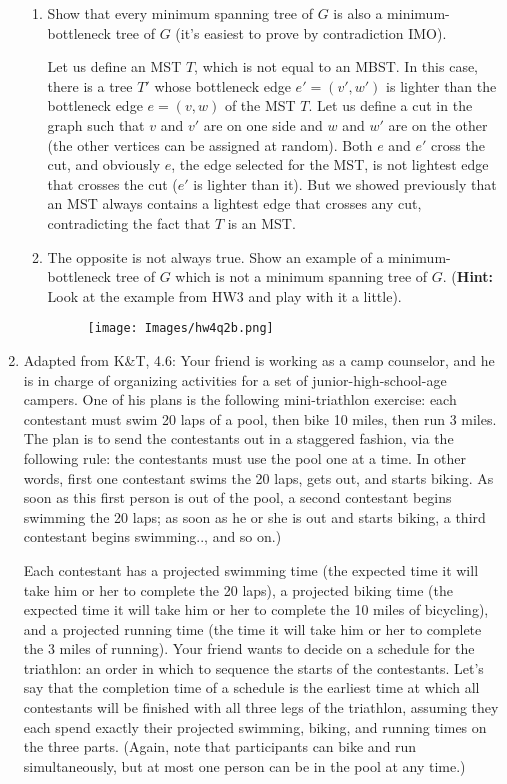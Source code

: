 \documentclass[letterpaper, 11pt]{article}
\begin{document}
\begin{enumerate}
    \begin{enumerate}
        \item Show that every minimum spanning tree of $G$ is also a minimum-bottleneck tree of $G$ (it's easiest to prove by contradiction IMO).

        Let us define an MST $T$, which is not equal to an MBST. In this case, there is a tree $T'$ whose bottleneck edge $e' = (v', w')$ is lighter than the bottleneck edge $e = (v,w)$ of the MST $T$. Let us define a cut in the graph such that $v$ and $v'$ are on one side and $w$ and $w'$ are on the other (the other vertices can be assigned at random). Both $e$ and $e'$ cross the cut, and obviously $e$, the edge selected for the MST, is not lightest edge that crosses the cut ($e'$ is lighter than it). But we showed previously that an MST always contains a lightest edge that crosses any cut, contradicting the fact that $T$ is an MST.        
        \item The opposite is not always true. Show an example of a minimum-bottleneck tree of $G$ which is not a minimum spanning tree of $G$. (\textbf{Hint:} Look at the example from HW3 and play with it a little).
        \begin{figure}[H]
            \centering
            \texttt{[image: Images/hw4q2b.png]}
        \end{figure}
    \end{enumerate}

    \item Adapted from K\&T, 4.6: Your friend is working as a camp counselor, and he is in charge of organizing activities for a set of junior-high-school-age campers. One of his plans is the following mini-triathlon exercise: each contestant must swim 20 laps of a pool, then bike 10 miles, then run 3 miles. The plan is to send the contestants out in a staggered fashion, via the following rule: the contestants must use the pool one at a time. In other words, first one contestant swims the 20 laps, gets out, and starts biking. As soon as this first person is out of the pool, a second contestant begins swimming the 20 laps; as soon as he or she is out and starts biking, a third contestant begins swimming.., and so on.)
    
    Each contestant has a projected swimming time (the expected time it will take him or her to complete the 20 laps), a projected biking time (the expected time it will take him or her to complete the 10 miles of bicycling), and a projected running time (the time it will take him or her to complete the 3 miles of running). Your friend wants to decide on a schedule for the triathlon: an order in which to sequence the starts of the contestants. Let’s say that the completion time of a schedule is the earliest time at which all contestants will be finished with all three legs of the triathlon, assuming they each spend exactly their projected swimming, biking, and running times on the three parts. (Again, note that participants can bike and run simultaneously, but at most one person can be in the pool at any time.)
    

\end{enumerate}
\end{document}
